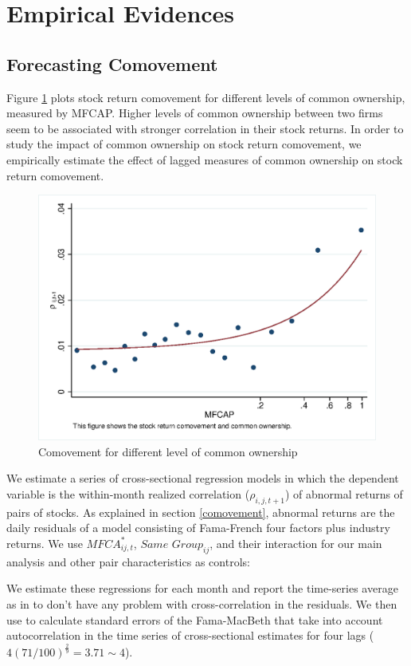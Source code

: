 
\section{Empirical Evidences}



\subsection{{Forecasting Comovement}}
\label{Forecasting Comovement}

	Figure \ref{mcorr50} plots stock return comovement for different levels of common ownership, measured by MFCAP.  Higher levels of common	ownership between two firms seem to be associated with stronger correlation in their stock returns. In order to study the impact of common ownership on stock return comovement, we empirically estimate the effect of lagged measures of common ownership on stock return comovement. 
	\begin{figure}[htbp]
	\centering  
	\centering
	\includegraphics[width=0.7\linewidth]{"Output/mcorr50.eps"} 
	\caption{Comovement for different level of common ownership }
	\label{mcorr50}
\end{figure}
	
	We estimate a series of cross-sectional regression models in which the dependent variable is the within-month realized correlation ($\rho_{i,j,t+1}$) of abnormal returns of pairs of stocks. As explained in section \ref{comovement}, abnormal returns are the daily residuals of a model consisting of Fama-French four factors plus industry returns. We use $\textit{MFCA}^*_{ij,t}$, $\textit{Same Group}_{ij} $, and their interaction for our main analysis and other pair characteristics as controls:
		

	
	We estimate these regressions for each month and report the time-series average as in \cite{FamaMacBeth} to don't have any problem with cross-correlation in the residuals. We then use  \cite{newey1987hypothesis} to calculate standard errors of the Fama-MacBeth that take into account autocorrelation in the time series of cross-sectional estimates for four lags ($ 4(71/100)^{\frac{2}{9}} = 3.71 \sim 4 $).
	
